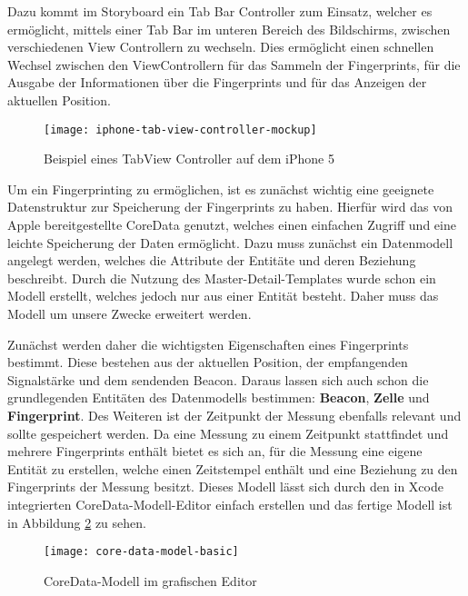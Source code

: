 Dazu kommt im Storyboard ein Tab Bar Controller zum Einsatz, welcher es ermöglicht, mittels einer Tab Bar im unteren Bereich des Bildschirms, zwischen verschiedenen View Controllern zu wechseln. Dies ermöglicht einen schnellen Wechsel zwischen den ViewControllern für das Sammeln der Fingerprints, für die Ausgabe der Informationen über die Fingerprints und für das Anzeigen der aktuellen Position.

\begin{figure}[htb!]
		\centering
	\texttt{[image: iphone-tab-view-controller-mockup]}
	\caption{Beispiel eines TabView Controller auf dem iPhone 5}
	\label{iphone-tab-view-controller}
\end{figure}

Um ein Fingerprinting zu ermöglichen, ist es zunächst wichtig eine geeignete Datenstruktur zur Speicherung der Fingerprints zu haben. Hierfür wird das von Apple bereitgestellte CoreData genutzt, welches einen einfachen Zugriff und eine leichte Speicherung der Daten ermöglicht. Dazu muss zunächst ein Datenmodell angelegt werden, welches die Attribute der Entitäte und deren Beziehung beschreibt. Durch die Nutzung des Master-Detail-Templates wurde schon ein Modell erstellt, welches jedoch nur aus einer Entität besteht. Daher muss das Modell um unsere Zwecke erweitert werden.

Zunächst werden daher die wichtigsten Eigenschaften eines Fingerprints bestimmt. Diese bestehen aus der aktuellen Position, der empfangenden Signalstärke und dem sendenden Beacon. Daraus lassen sich auch schon die grundlegenden Entitäten des Datenmodells bestimmen: \textbf{Beacon}, \textbf{Zelle} und \textbf{Fingerprint}. Des Weiteren ist der Zeitpunkt der Messung ebenfalls relevant und sollte gespeichert werden. Da eine Messung zu einem Zeitpunkt stattfindet und mehrere Fingerprints enthält bietet es sich an, für die Messung eine eigene Entität zu erstellen, welche einen Zeitstempel enthält und eine Beziehung zu den Fingerprints der Messung besitzt. 
Dieses Modell lässt sich durch den in Xcode integrierten CoreData-Modell-Editor einfach erstellen und das fertige Modell ist in Abbildung \ref{core-data-model-basic} zu sehen.

\begin{figure}[htb!]
		\centering
	\texttt{[image: core-data-model-basic]}
	\caption{CoreData-Modell im grafischen Editor}
	\label{core-data-model-basic}
\end{figure}

